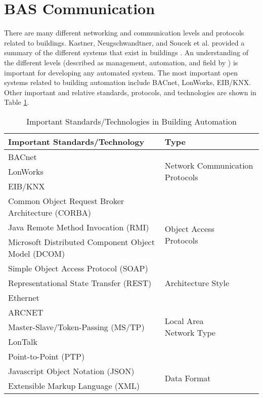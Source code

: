 \section{BAS Communication}

There are many different networking and communication levels and protocols related to buildings. Kastner, Neugschwandtner, and Soucek et al. provided a summary of the different systems that exist in buildings \cite{Kastner2005}. An understanding of the different levels (described as management, automation, and field by \cite{Kastner2005}) is important for developing any automated system. The most important open systems related to building automation include BACnet, LonWorks, EIB/KNX. Other important and relative standards, protocols, and technologies are shown in Table \ref{tab:CommunicationProtocols}.


\begin{table}
\centering
\begin{tabular}{ l  p{4cm} }
\toprule
Important Standards/Technology & Type \\
\midrule
\midrule
BACnet & \multirow{3}{*}{\parbox[t]{4cm}{Network Communication Protocols}} \\
LonWorks & \\ 
EIB/KNX & \\
\midrule
Common Object Request Broker Architecture (CORBA) &  \multirow{4}{*}{\parbox[t]{4cm}{Object Access\\Protocols}}  \\
Java Remote Method Invocation (RMI) &            \\
Microsoft Distributed Component Object Model (DCOM) & \\
Simple Object Access Protocol (SOAP) & \\
\midrule	
Representational State Transfer (REST) &  Architecture Style \\
\midrule
Ethernet & \multirow{5}{*}{\parbox[t]{4cm}{Local Area\\Network Type}} \\
ARCNET & \\
Master-Slave/Token-Passing (MS/TP) & \\
LonTalk & \\
Point-to-Point (PTP) & \\
\midrule
Javascript Object Notation (JSON) & \multirow{2}{*}{Data Format} \\
Extensible Markup Language (XML) & \\


\bottomrule

\end{tabular}
\caption{Important Standards/Technologies in Building Automation}
\label{tab:CommunicationProtocols}

\end{table}

